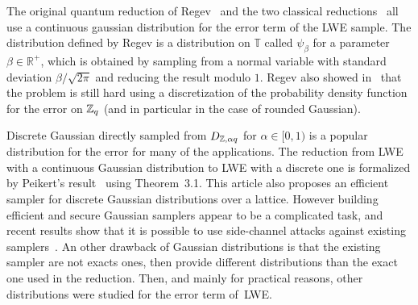 The original quantum reduction of Regev~\cite{Reg05} and the two classical reductions~\cite{Pei09,BLPRS13} all use a continuous gaussian distribution for the error term of the LWE sample. 
The distribution defined by Regev is a distribution on $\mathbb{T}$ called $\psi_{\beta}$ for a parameter $\beta \in \mathbb{R}^+$, which is obtained by sampling from a normal variable with standard deviation $\beta / \sqrt{2 \pi}$ and reducing the result modulo $1$. Regev also showed in~\cite[Lemma 4.3]{Reg05} that the problem is still hard using a discretization of the probability density function for the error on $\mathbb{Z}_q$ (and in particular in the case of rounded Gaussian).

Discrete Gaussian directly sampled from $D_{\mathbb{Z},\alpha q}$ for $\alpha \in [0,1)$ is a popular distribution for the error for many of the applications. The reduction from LWE with a continuous Gaussian distribution to LWE with a discrete one is formalized by Peikert's result~\cite{Pei10} using Theorem~3.1.
This article also proposes an efficient sampler for discrete Gaussian distributions over a lattice. However building efficient and secure Gaussian samplers appear to be a complicated task, and recent results show that it is possible to use side-channel attacks against existing samplers~\cite{BHLY16,Pessl16,Saarinen18}. 
An other drawback of Gaussian distributions is that the existing sampler are not exacts ones, then provide different distributions than the exact one used in the reduction. 
Then, and mainly for practical reasons, other distributions were studied for the error term of~LWE.
